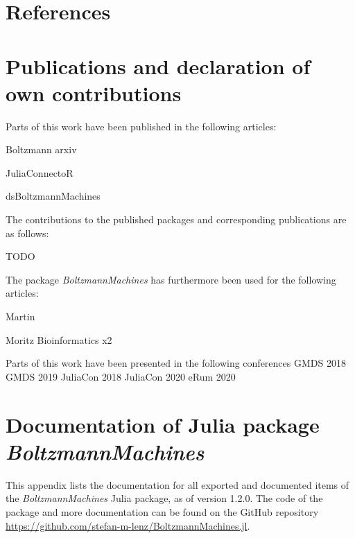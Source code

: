 \documentclass[12pt]{article}
\newcommand{\apkg}[1]{\emph{#1}}
\begin{document}
\begin{appendices}
\singlespacing
\section{References}

\renewcommand{\bibsection}{} %



\clearpage
\onehalfspacing
\section[Publications and declaration of own contributions]{Publications and declaration of \\ own contributions}
Parts of this work have been published in the following articles:

Boltzmann arxiv

JuliaConnectoR

dsBoltzmannMachines

The contributions to the published packages and corresponding publications are as follows:

TODO

The package \apkg{BoltzmannMachines} has furthermore been used for the following articles:

Martin

Moritz Bioinformatics x2

Parts of this work have been presented in the following conferences
GMDS 2018
GMDS 2019
JuliaCon 2018
JuliaCon 2020
eRum 2020

\setlength{\emergencystretch}{3em}


\clearpage
\section[Documentation of Julia package \apkg{BoltzmannMachines}]{Documentation of Julia package \\ \apkg{BoltzmannMachines}}
\label{BMDoku}

This appendix lists the documentation for all exported and documented items of the \apkg{BoltzmannMachines} Julia package, as of version 1.2.0. The code of the package and more documentation can be found on the GitHub repository \url{https://github.com/stefan-m-lenz/BoltzmannMachines.jl}.



\clearpage

\end{appendices}
\end{document}
